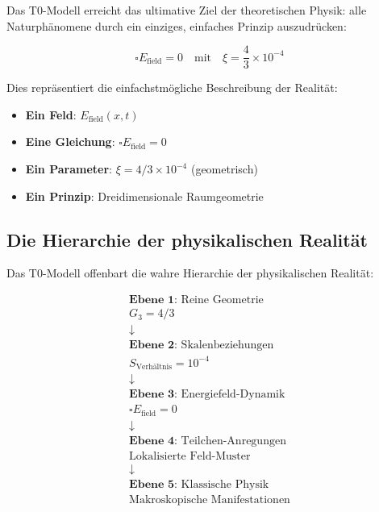 \documentclass[12pt,a4paper]{report}
\begin{document}
	Das T0-Modell erreicht das ultimative Ziel der theoretischen Physik: alle Naturphänomene durch ein einziges, einfaches Prinzip auszudrücken:
	
	\begin{equation}
		\boxed{\square E_{\text{field}} = 0 \quad \text{mit} \quad \xi = \frac{4}{3} \times 10^{-4}}
	\end{equation}
	
	Dies repräsentiert die einfachstmögliche Beschreibung der Realität:
	\begin{itemize}
		\item \textbf{Ein Feld}: $E_{\text{field}}(x,t)$
		\item \textbf{Eine Gleichung}: $\square E_{\text{field}} = 0$
		\item \textbf{Ein Parameter}: $\xi = 4/3 \times 10^{-4}$ (geometrisch)
		\item \textbf{Ein Prinzip}: Dreidimensionale Raumgeometrie
	\end{itemize}
	
	\subsection{Die Hierarchie der physikalischen Realität}
	\label{subsec:hierarchy_reality}
	
	Das T0-Modell offenbart die wahre Hierarchie der physikalischen Realität:
	
	\begin{equation}
		\begin{array}{c}
			\textbf{Ebene 1:} \text{ Reine Geometrie} \\
			G_3 = 4/3 \\
			\downarrow \\
			\textbf{Ebene 2:} \text{ Skalenbeziehungen} \\
			S_{\text{Verhältnis}} = 10^{-4} \\
			\downarrow \\
			\textbf{Ebene 3:} \text{ Energiefeld-Dynamik} \\
			\square E_{\text{field}} = 0 \\
			\downarrow \\
			\textbf{Ebene 4:} \text{ Teilchen-Anregungen} \\
			\text{Lokalisierte Feld-Muster} \\
			\downarrow \\
			\textbf{Ebene 5:} \text{ Klassische Physik} \\
			\text{Makroskopische Manifestationen}
		\end{array}
	\end{equation}
	
\end{document}
